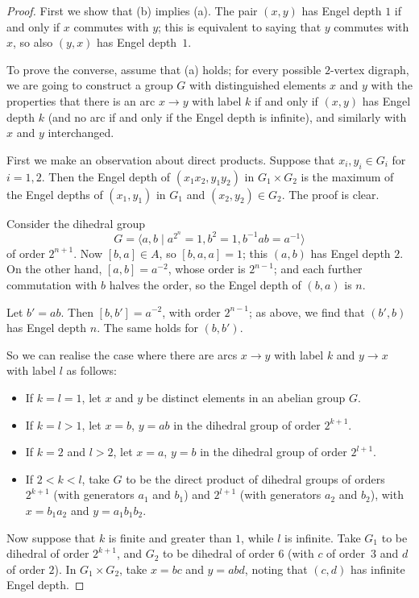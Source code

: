\documentclass[reqno,12pt]{amsart}
\theoremstyle{plain}
\theoremstyle{definition}
\begin{document}
\begin{proof}
First we show that (b) implies (a). The pair $(x,y)$ has Engel
depth $1$ if and only if $x$ commutes with $y$; this is equivalent to saying
that $y$ commutes with $x$, so also $(y,x)$ has Engel depth~$1$.

\medskip

To prove the converse, assume that (a) holds; for every possible $2$-vertex
digraph, we are going to construct a group $G$ with distinguished elements
$x$ and $y$ with the properties that there is an arc $x\to y$ with label $k$
if and only if $(x,y)$ has Engel depth $k$ (and no arc if and only if the
Engel depth is infinite), and similarly with $x$ and $y$ interchanged.

First we make an observation about direct products. Suppose that
$x_i,y_i\in G_i$ for $i=1,2$. Then the Engel depth of $(x_1x_2,y_1y_2)$
in $G_1\times G_2$ is the maximum of the Engel depths of $(x_1,y_1)$ in $G_1$
and $(x_2,y_2)\in G_2$. The proof is clear.

Consider the dihedral group 
\[G=\langle a,b\mid a^{2^n}=1,b^2=1,b^{-1}ab=a^{-1}\rangle\]
of order $2^{n+1}$. Now $[b,a]\in A$, so $[b,a,a]=1$; this $(a,b)$ has
Engel depth $2$. On the other hand, $[a,b]=a^{-2}$, whose order is
$2^{n-1}$; and each further commutation with $b$ halves the order, so the
Engel depth of $(b,a)$ is $n$.

Let $b'=ab$. Then $[b,b']=a^{-2}$, with order $2^{n-1}$; as above, we find
that $(b',b)$ has Engel depth $n$. The same holds for $(b,b')$.

So we can realise the case where there are arcs $x\to y$ with label $k$ and
$y\to x$ with label $l$ as follows:
\begin{itemize}
\item If $k=l=1$, let $x$ and $y$ be distinct elements in an abelian group $G$.
\item If $k=l>1$, let $x=b$, $y=ab$ in the dihedral group of order $2^{k+1}$.
\item If $k=2$ and $l>2$, let $x=a$, $y=b$ in the dihedral group of order
$2^{l+1}$.
\item If $2<k<l$, take $G$ to be the direct product of dihedral groups of orders
$2^{k+1}$ (with generators $a_1$ and $b_1$) and $2^{l+1}$ (with generators
$a_2$ and $b_2$), with $x=b_1a_2$ and $y=a_1b_1b_2$.
\end{itemize}

Now suppose that $k$ is finite and greater than $1$, while $l$ is infinite.
Take $G_1$ to be dihedral of order $2^{k+1}$, and $G_2$ to be dihedral of 
order $6$ (with $c$ of order~$3$ and $d$ of order $2$). In $G_1\times G_2$,
take $x=bc$ and $y=abd$, noting that $(c,d)$ has infinite Engel depth.


\end{proof}
\end{document}
